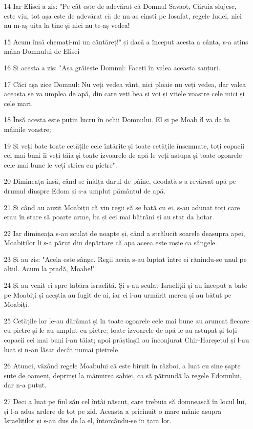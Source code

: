 \par 14 Iar Elisei a zis: "Pe cât este de adevărat că Domnul Savaot, Căruia slujesc, este viu, tot așa este de adevărat că de nu aș cinsti pe Iosafat, regele Iudei, nici nu m-aș uita la tine și nici nu te-aș vedea!
\par 15 Acum însă chemați-mi un cântăreț!" și dacă a început acesta a cânta, s-a atins mâna Domnului de Elisei
\par 16 Și acesta a zis: "Așa grăiește Domnul: Faceți în valea aceasta șanțuri.
\par 17 Căci așa zice Domnul: Nu veți vedea vânt, nici ploaie nu veți vedea, dar valea aceasta se va umplea de apă, din care veți bea și voi și vitele voastre cele mici și cele mari.
\par 18 Însă acesta este puțin lucru în ochii Domnului. El și pe Moab îl va da în mâinile voastre;
\par 19 Și veți bate toate cetățile cele întărite și toate cetățile însemnate, toți copacii cei mai buni îi veți tăia și toate izvoarele de apă le veți astupa și toate ogoarele cele mai bune le veți strica cu pietre".
\par 20 Dimineața însă, când se înălța darul de pâine, deodată s-a revărsat apă pe drumul dinspre Edom și s-a umplut pământul de apă.
\par 21 Și când au auzit Moabiții că vin regii să se bată cu ei, s-au adunat toți care erau în stare să poarte arme, ba și cei mai bătrâni și au stat da hotar.
\par 22 Iar dimineața s-au sculat de noapte și, când a strălucit soarele deasupra apei, Moabiților li s-a părut din depărtare că apa aceea este roșie ca sângele.
\par 23 Și au zis: "Acela este sânge. Regii aceia s-au luptat între ei rănindu-se unul pe altul. Acum la pradă, Moabe!"
\par 24 Și au venit ei spre tabăra israelită. Și s-au sculat Israeliții și au început a bate pe Moabiți și aceștia au fugit de ai, iar ei i-au urmărit mereu și au bătut pe Moabiți.
\par 25 Cetățile lor le-au dărâmat și în toate ogoarele cele mai bune au aruncat fiecare cu pietre și le-au umplut cu pietre; toate izvoarele de apă le-au astupat și toți copacii cei mai buni i-au tăiat; apoi prăștiașii au înconjurat Chir-Hareșetul și l-au luat și n-au lăsat decât numai pietrele.
\par 26 Atunci, văzând regele Moabului că este biruit în război, a luat cu sine șapte sute de oameni, deprinși la mânuirea sabiei, ca să pătrundă la regele Edomului, dar n-a putut.
\par 27 Deci a luat pe fiul său cel întâi născut, care trebuia să domnească în locul lui, și l-a adus ardere de tot pe zid. Aceasta a pricinuit o mare mânie asupra Israeliților și s-au dus de la el, întorcându-se în țara lor.

